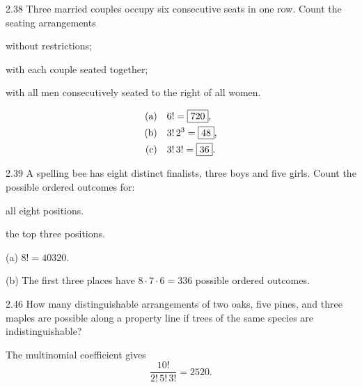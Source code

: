 \documentclass[11pt,oneside]{article}
\begin{document}
\begin{exercise}{2.38}
Three married couples occupy six consecutive seats in one row. Count the seating arrangements
\par
\begin{exercisesubparts}
\item without restrictions;
\item with each couple seated together;
\item with all men consecutively seated to the right of all women.
\end{exercisesubparts}
\end{exercise}

\begin{solution}
\begin{align*}
\textup{(a)}\quad&6!=\boxed{720},\\
\textup{(b)}\quad&3!\,2^3=\boxed{48},\\
\textup{(c)}\quad&3!\,3!=\boxed{36}.
\end{align*}
\end{solution}

\begin{exercise}{2.39}
A spelling bee has eight distinct finalists, three boys and five girls. Count the possible ordered outcomes for:
\begin{exercisesubparts}
\item all eight positions.
\item the top three positions.
\end{exercisesubparts}
\end{exercise}

\begin{solution}
\textup{(a)} $8!=\boxed{40320}$.\par\medskip
\noindent\textup{(b)} The first three places have $8\cdot7\cdot6=\boxed{336}$ possible ordered outcomes.
\end{solution}

\begin{exercise}{2.46}
How many distinguishable arrangements of two oaks, five pines, and three maples are possible along a property line if trees of the same species are indistinguishable?
\end{exercise}

\begin{solution}
The multinomial coefficient gives
\[
\frac{10!}{2!\,5!\,3!}=\boxed{2520}.
\]
\end{solution}
\end{document}
